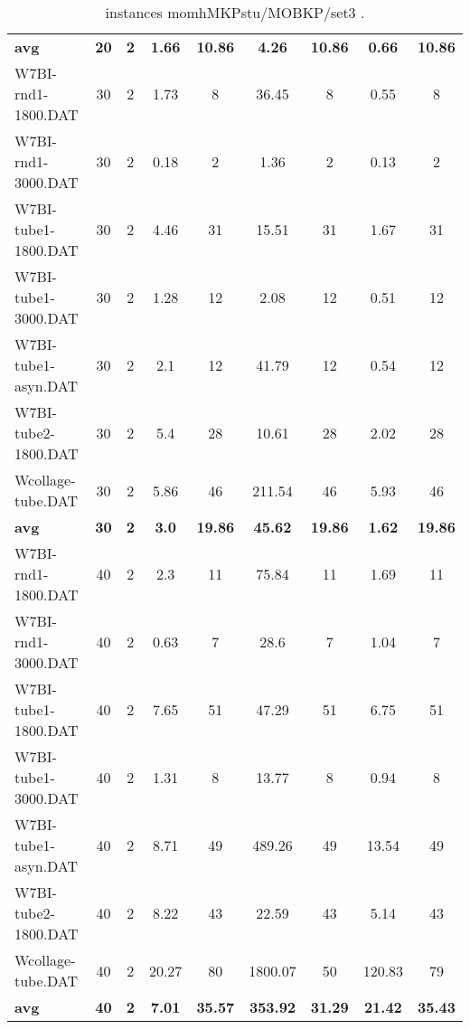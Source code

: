 \begin{table}[!ht]
{\begin{tabular}{lcccccccc}
\cline{1-9} \textbf{avg} & \textbf{20} & \textbf{2} & \textbf{1.66} & \textbf{10.86} & \textbf{4.26} & \textbf{10.86} & \textbf{0.66} & \textbf{10.86} \\ \cline{1-9}
W7BI-rnd1-1800.DAT & 30 & 2 & 1.73 & 8 & 36.45 & 8 &  \textcolor{blue2}{0.55} & 8 \\
W7BI-rnd1-3000.DAT & 30 & 2 & 0.18 & 2 & 1.36 & 2 &  \textcolor{blue2}{0.13} & 2 \\
W7BI-tube1-1800.DAT & 30 & 2 & 4.46 & 31 & 15.51 & 31 &  \textcolor{blue2}{1.67} & 31 \\
W7BI-tube1-3000.DAT & 30 & 2 & 1.28 & 12 & 2.08 & 12 &  \textcolor{blue2}{0.51} & 12 \\
W7BI-tube1-asyn.DAT & 30 & 2 & 2.1 & 12 & 41.79 & 12 &  \textcolor{blue2}{0.54} & 12 \\
W7BI-tube2-1800.DAT & 30 & 2 & 5.4 & 28 & 10.61 & 28 &  \textcolor{blue2}{2.02} & 28 \\
Wcollage-tube.DAT & 30 & 2 &  \textcolor{blue2}{5.86} & 46 & 211.54 & 46 & 5.93 & 46 \\
\cline{1-9} \textbf{avg} & \textbf{30} & \textbf{2} & \textbf{3.0} & \textbf{19.86} & \textbf{45.62} & \textbf{19.86} & \textbf{1.62} & \textbf{19.86} \\ \cline{1-9}
W7BI-rnd1-1800.DAT & 40 & 2 & 2.3 & 11 & 75.84 & 11 &  \textcolor{blue2}{1.69} & 11 \\
W7BI-rnd1-3000.DAT & 40 & 2 &  \textcolor{blue2}{0.63} & 7 & 28.6 & 7 & 1.04 & 7 \\
W7BI-tube1-1800.DAT & 40 & 2 & 7.65 & 51 & 47.29 & 51 &  \textcolor{blue2}{6.75} & 51 \\
W7BI-tube1-3000.DAT & 40 & 2 & 1.31 & 8 & 13.77 & 8 &  \textcolor{blue2}{0.94} & 8 \\
W7BI-tube1-asyn.DAT & 40 & 2 &  \textcolor{blue2}{8.71} & 49 & 489.26 & 49 & 13.54 & 49 \\
W7BI-tube2-1800.DAT & 40 & 2 & 8.22 & 43 & 22.59 & 43 &  \textcolor{blue2}{5.14} & 43 \\
Wcollage-tube.DAT & 40 & 2 &  \textcolor{blue2}{20.27} & 80 & 1800.07 & 50 & 120.83 & 79 \\
\cline{1-9} \textbf{avg} & \textbf{40} & \textbf{2} & \textbf{7.01} & \textbf{35.57} & \textbf{353.92} & \textbf{31.29} & \textbf{21.42} & \textbf{35.43} \\ \cline{1-9}
\bottomrule
\end{tabular}
}%
\caption{ instances momhMKPstu/MOBKP/set3 .}
\label{tab:table_compareBB_momhMKPstu/MOBKP/set3 }
\end{table}
